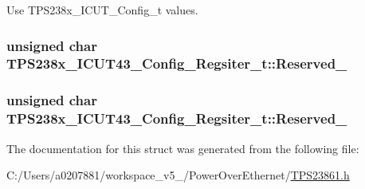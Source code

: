 Use T\-P\-S238x\-\_\-\-I\-C\-U\-T\-\_\-\-Config\-\_\-t values. 

\hypertarget{struct_t_p_s238x___i_c_u_t43___config___regsiter__t_a26925269078b96cfc7e9c91fcecaf905}{
\subsubsection[{Reserved\-\_\-10}]{\setlength{\rightskip}{0pt plus 5cm}unsigned char T\-P\-S238x\-\_\-\-I\-C\-U\-T43\-\_\-\-Config\-\_\-\-Regsiter\-\_\-t\-::\-Reserved\-\_}}\label{struct_t_p_s238x___i_c_u_t43___config___regsiter__t_a26925269078b96cfc7e9c91fcecaf905}
\hypertarget{struct_t_p_s238x___i_c_u_t43___config___regsiter__t_a45c08501c716490c794d6f3a2cfc2d16}{
\subsubsection[{Reserved\-\_\-11}]{\setlength{\rightskip}{0pt plus 5cm}unsigned char T\-P\-S238x\-\_\-\-I\-C\-U\-T43\-\_\-\-Config\-\_\-\-Regsiter\-\_\-t\-::\-Reserved\-\_}}\label{struct_t_p_s238x___i_c_u_t43___config___regsiter__t_a45c08501c716490c794d6f3a2cfc2d16}


The documentation for this struct was generated from the following file\-:\begin{DoxyCompactItemize}
\item 
C\-:/\-Users/a0207881/workspace\-\_\-v5\-\_/\-Power\-Over\-Ethernet/\hyperlink{_t_p_s23861_8h}{T\-P\-S23861.\-h}\end{DoxyCompactItemize}
